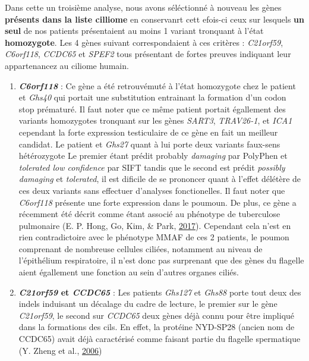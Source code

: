 \documentclass[12pt,twoside]{reedthesis}
\theoremstyle{definition}
\theoremstyle{definition}
\theoremstyle{remark}
\begin{document}
  Dans cette un troisième analyse, nous avons séléctionné à nouveau les
  gènes \textbf{présents dans la liste cilliome} en conservanrt cett
  efois-ci ceux sur lesquels \textbf{un seul} de nos patients présentaient
  au moins 1 variant tronquant à l'état \textbf{homozygote}. Les 4 gènes
  suivant correspondaient à ces critères : \emph{C21orf59},
  \emph{C6orf118}, \emph{CCDC65} et \emph{SPEF2} tous présentant de fortes
  preuves indiquant leur appartenancez au ciliome humain.
  
  \begin{enumerate}
  \def\labelenumi{\arabic{enumi}.}
  \item
    \textbf{\emph{C6orf118}} : Ce gène a été retrouvémuté à l'état
    homozygote chez le patient et \emph{Ghs40} qui portait une
    substitution entrainant la formation d'un codon stop prématuré. Il
    faut noter que ce même patient portait égallement des variants
    homozygotes tronquant sur les gènes \emph{SART3}, \emph{TRAV26-1}, et
    \emph{ICA1} cependant la forte expression testiculaire de ce gène en
    fait un meilleur candidat. Le patient et \emph{Ghs27} quant à lui
    porte deux variants faux-sens hétérozygote Le premier étant prédit
    probably \emph{damaging} par PolyPhen et \emph{tolerated low
    confidence} par SIFT tandis que le second est prédit \emph{possibly
    damaging} et \emph{tolerated}, il est dificile de se prononcer quant à
    l'effet délétère de ces deux variants sans effectuer d'analyses
    fonctionelles. Il faut noter que \emph{C6orf118} présente une forte
    expression dans le poumoun. De plus, ce gène a récemment été décrit
    comme étant associé au phénotype de tuberculose pulmonaire (E. P.
    Hong, Go, Kim, \& Park, \protect\hyperlink{ref-Hong2017}{2017}).
    Cependant cela n'est en rien contradictoire avec le phénotype MMAF de
    ces 2 patients, le poumon comprenant de nombreuse cellules ciliées,
    notamment au niveau de l'épithélium respiratoire, il n'est donc pas
    surprenant que des gènes du flagelle aient égallement une fonction au
    sein d'autres organes ciliés.
  \item
    \textbf{\emph{C21orf59} et \emph{CCDC65}} : Les patients \emph{Ghs127}
    et \emph{Ghs88} porte tout deux des indels induisant un décalage du
    cadre de lecture, le premier sur le gène \emph{C21orf59}, le second
    sur \emph{CCDC65} deux gènes déjà connu pour être impliqué dans la
    formations des cils. En effet, la protéine NYD-SP28 (ancien nom de
    CCDC65) avait déjà caractérisé comme faisant partie du flagelle
    spermatique (Y. Zheng et al., \protect\hyperlink{ref-Zheng2006}{2006})

\end{enumerate}
\end{document}
